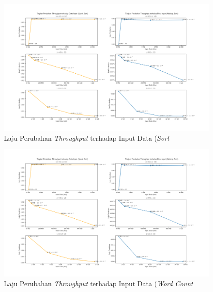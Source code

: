 \begin{landscape}
\begin{figure}[h]
    \centering
    \includegraphics[height=0.6\linewidth]{figures/ch04/3-0-th-sort.png}
    \caption{Laju Perubahan \textit{Throughput} terhadap Input Data (\textit{Sort}}
    \label{fig:3-0-th-sort}
\end{figure}
\end{landscape}

\begin{landscape}
\begin{figure}[h]
    \centering
    \includegraphics[height=0.6\linewidth]{figures/ch04/3-0-th-sort.png}
    \caption{Laju Perubahan \textit{Throughput} terhadap Input Data (\textit{Word Count}}
    \label{fig:3-0-th-wc}
\end{figure}
\end{landscape}

